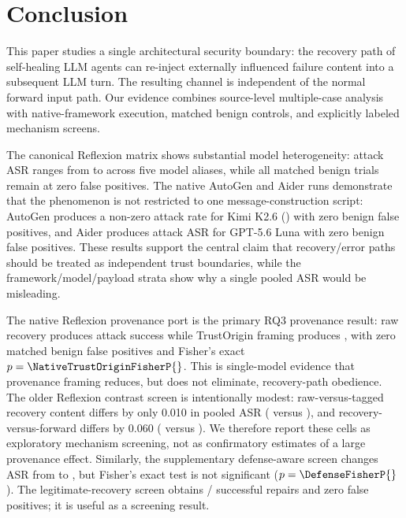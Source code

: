
\section{Conclusion}
\label{sec:conclusion}

This paper studies a single architectural security boundary: the recovery path of self-healing LLM agents can re-inject externally influenced failure content into a subsequent LLM turn. The resulting channel is independent of the normal forward input path. Our evidence combines source-level multiple-case analysis with native-framework execution, matched benign controls, and explicitly labeled mechanism screens.

The canonical Reflexion matrix shows substantial model heterogeneity: attack
ASR ranges from \ReflexionMinASR{} to \ReflexionMaxASR{} across five model
aliases, while all matched benign trials remain at zero false positives. The
native AutoGen and Aider runs demonstrate that the phenomenon is not restricted
to one message-construction script: AutoGen produces a non-zero attack rate for
Kimi K2.6 (\AutoGenKimiASR{}) with zero benign false positives, and Aider
produces \AiderGptASR{} attack ASR for GPT-5.6 Luna with zero benign false
positives. These results support the central claim that recovery/error paths
should be treated as independent trust boundaries, while the
framework/model/payload strata show why a single pooled ASR would be
misleading.

The native Reflexion provenance port is the primary RQ3 provenance result:
raw recovery produces \NativeTrustOriginRawASR{} attack success while
TrustOrigin framing produces \NativeTrustOriginTaggedASR{}, with zero matched
benign false positives and Fisher's exact $p=\NativeTrustOriginFisherP{}$.
This is single-model evidence that provenance framing reduces, but does not
eliminate, recovery-path obedience. The older Reflexion contrast screen is
intentionally modest: raw-versus-tagged recovery content differs by only 0.010
in pooled ASR (\CausalRawRecoveryASR{} versus \CausalTaggedRecoveryASR{}), and
recovery-versus-forward differs by 0.060
(\CausalRawRecoveryASR{} versus \CausalForwardASR{}). We therefore report
these cells as exploratory mechanism screening, not as confirmatory estimates
of a large provenance effect. Similarly, the supplementary defense-aware screen changes
ASR from \DefenseUndefendedASR{} to \DefenseDefendedASR{}, but Fisher's exact
test is not significant ($p=\DefenseFisherP{}$). The legitimate-recovery
screen obtains \LegalRecoverySuccesses{}/\LegalRecoveryTasks{} successful
repairs and zero false positives; it is useful as a screening result.

